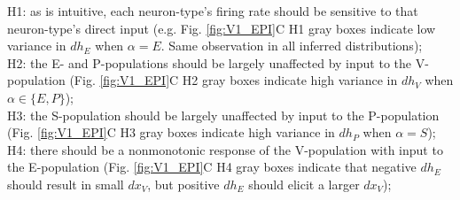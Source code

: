 \documentclass[11pt]{article}
\begin{document}
{\addtolength{\leftskip}{10 mm}
H1: as is intuitive, each neuron-type's firing rate should be sensitive to that neuron-type's direct input (e.g. Fig. \ref{fig:V1_EPI}C H1 gray boxes indicate low variance in $dh_E$ when $\alpha=E$. Same observation in all inferred distributions); \\
H2: the E- and P-populations should be largely unaffected by input to the V-population (Fig. \ref{fig:V1_EPI}C H2 gray boxes indicate high variance in $dh_V$ when $\alpha \in \{E, P \}$); \\
H3: the S-population should be largely unaffected by input to the P-population  (Fig. \ref{fig:V1_EPI}C H3 gray boxes indicate high variance in $dh_P$ when $\alpha =S$); \\
H4: there should be a nonmonotonic response of the V-population with input to the E-population (Fig. \ref{fig:V1_EPI}C H4 gray boxes indicate that negative $dh_E$ should result in small $dx_{V}$, but positive $dh_E$ should elicit a larger $dx_{V}$);

}
\end{document}
